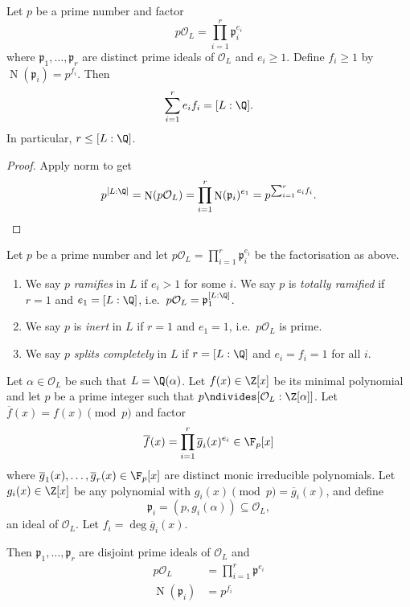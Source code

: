 \documentclass[a4paper]{article}
\renewcommand*{\O}{\mathcal{O}}
\DeclareMathOperator{\n}{N}
\newcommand*{\red}[1]{\overline{#1}}%
\begin{document}
\begin{lemma}
  Let \(p\) be a prime number and factor
  \[
    p \O_L = \prod_{i = 1}^r \mathfrak{p}_i^{e_i}
  \]
  where \(\mathfrak{p}_1, \dots, \mathfrak{p}_r\) are distinct prime ideals of \(\O_L\) and \(e_i \geq 1\). Define \(f_i \geq 1\) by \(\n(\mathfrak{p}_i) = p^{f_i}\). Then
  \[
    \sum_{i = 1}^r e_if_i = [L:\Q].
  \]
  In particular, \(r \leq [L:\Q]\).
\end{lemma}

\begin{proof}
  Apply norm to get
  \[
    p^{[L:\Q]} = \n(p\O_L) = \prod_{i = 1}^r \n(\mathfrak{p}_i)^{e_1} = p^{\sum_{i = 1}^r e_if_i}.
  \]
\end{proof}

\begin{definition}[Ramification]
  Let \(p\) be a prime number and let \(p\O_L = \prod_{i = 1}^r \mathfrak{p}_i^{e_i}\) be the factorisation as above.
  \begin{enumerate}
  \item We say \(p\) \emph{ramifies} in \(L\) if \(e_i > 1\) for some \(i\). We say \(p\) is \emph{totally ramified} if \(r = 1\) and \(e_1 = [L:\Q]\), i.e.\ \(p\O_L = \mathfrak{p}_1^{[L:\Q]}\).
  \item We say \(p\) is \emph{inert} in \(L\) if \(r = 1\) and \(e_1 = 1\), i.e.\ \(p\O_L\) is prime.
  \item We say \(p\) \emph{splits completely} in \(L\) if \(r = [L:\Q]\) and \(e_i = f_i = 1\) for all \(i\).
  \end{enumerate}
\end{definition}

\begin{theorem}
  \label{thm:Dedekind}
  Let \(\alpha \in \O_L\) be such that \(L = \Q(\alpha)\). Let \(f(x) \in \Z[x]\) be its minimal polynomial and let \(p\) be a prime integer such that \(p \ndivides [\O_L:\Z[\alpha]]\). Let \(\red f(x) = f(x) \pmod p\) and factor
  \[
    \red f(x) = \prod_{i = 1}^r \red g_i(x)^{e_i} \in \F_p[x]
  \]
  where \(\red g_1(x), \dots, \red g_r(x) \in \F_p[x]\) are distinct monic irreducible polynomials. Let \(g_i(x) \in \Z[x]\) be any polynomial with \(g_i(x) \pmod p = \red g_i(x)\), and define
  \[
    \mathfrak{p}_i = (p, g_i(\alpha)) \subseteq \O_L,
  \]
  an ideal of \(\O_L\). Let \(f_i = \deg \red g_i(x)\).

  Then \(\mathfrak{p}_1, \dots, \mathfrak{p}_r\) are disjoint prime ideals of \(\O_L\) and
  \begin{align*}
    p\O_L &= \prod_{i = 1}^r \mathfrak{p}^{e_i} \\
    \n(\mathfrak{p}_i) &= p^{f_i}
  \end{align*}
\end{theorem}
\end{document}
